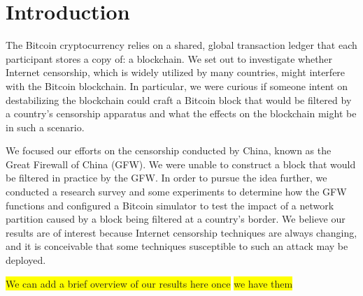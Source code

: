 \section{Introduction}
The Bitcoin cryptocurrency relies on a shared, global transaction ledger that each participant stores a copy of: a blockchain. We set out to investigate whether Internet censorship, which is widely utilized by many countries, might interfere with the Bitcoin blockchain. In particular, we were curious if someone intent on destabilizing the blockchain could craft a Bitcoin block that would be filtered by a country's censorship apparatus and what the effects on the blockchain might be in such a scenario.

We focused our efforts on the censorship conducted by China, known as the Great Firewall of China (GFW). We were unable to construct a block that would be filtered in practice by the GFW. In order to pursue the idea further, we conducted a research survey and some experiments to determine how the GFW functions and configured a Bitcoin simulator to test the impact of a network partition caused by a block being filtered at a country's border. We believe our results are of interest because Internet censorship techniques are always changing, and it is conceivable that some techniques susceptible to such an attack may be deployed.

\colorbox{yellow}{We can add a brief overview of our results here once}
\colorbox{yellow}{we have them}
